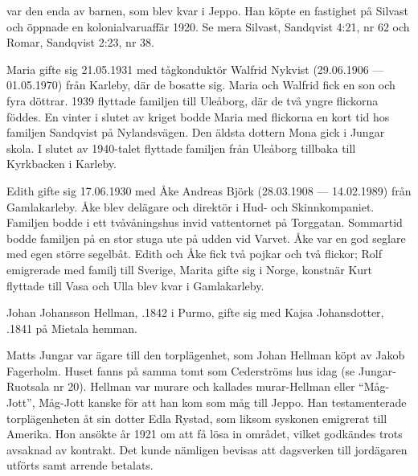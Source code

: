  var den enda av barnen, som blev kvar i Jeppo. Han köpte en fastighet på Silvast och öppnade en kolonialvaruaffär 1920. Se mera 	Silvast, Sandqvist 4:21, nr 62 och Romar, Sandqvist 2:23, nr 38.

Maria gifte sig 21.05.1931 med tågkonduktör Walfrid Nykvist (29.06.1906 --- 01.05.1970) från Karleby, där de bosatte sig. Maria och Walfrid fick en son och fyra döttrar. 1939 flyttade familjen till Uleåborg, där de två yngre flickorna föddes. En vinter i slutet av kriget bodde Maria med flickorna en kort tid hos familjen Sandqvist på Nylandsvägen. Den äldsta dottern Mona gick i Jungar skola. I slutet av 1940-talet flyttade familjen från Uleåborg tillbaka till Kyrkbacken i Karleby.

Edith gifte sig 17.06.1930 med Åke Andreas Björk (28.03.1908 --- 14.02.1989) från Gamlakarleby. Åke blev delägare och direktör i Hud- 	och Skinnkompaniet. Familjen bodde i ett tvåvåningshus invid 	vattentornet på Torggatan. Sommartid bodde familjen på en stor stuga ute på udden vid Varvet. Åke var en god seglare med egen större segelbåt. Edith och Åke fick två pojkar och två flickor; Rolf emigrerade med familj till Sverige, Marita gifte sig i Norge, konstnär Kurt flyttade till Vasa och Ulla blev kvar i Gamlakarleby.



%


%
Johan Johansson Hellman, .1842 i Purmo, gifte sig med Kajsa Johansdotter, .1841 på Mietala hemman.
\begin{jhchildren}
  \item {}
  \item {}
  \item {}
  \item {}
\end{jhchildren}
Matts Jungar var ägare till den torplägenhet, som Johan Hellman köpt av Jakob Fagerholm. Huset fanns på samma tomt som Cederströms hus idag (se Jungar-Ruotsala nr 20). Hellman var murare och kallades murar-Hellman eller ``Måg-Jott'', Måg-Jott kanske för att han kom som måg till Jeppo. Han testamenterade torplägenheten åt sin dotter Edla Rystad, som liksom syskonen emigrerat till Amerika. Hon ansökte år 1921 om att få lösa in området, vilket godkändes trots avsaknad av kontrakt. Det kunde nämligen bevisas att dagsverken till jordägaren utförts samt arrende betalats.

